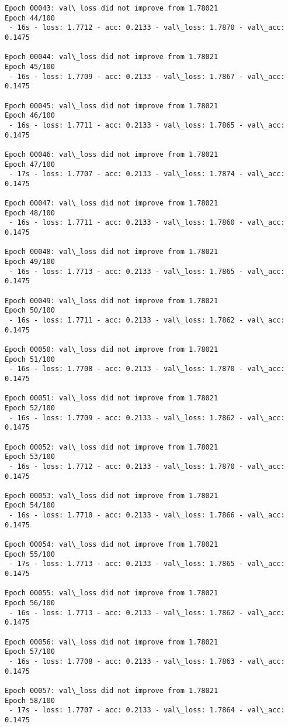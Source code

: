 \documentclass[11pt]{article}
\begin{document}
\begin{Verbatim}[commandchars=\\\{\}]
Epoch 00043: val\_loss did not improve from 1.78021
Epoch 44/100
 - 16s - loss: 1.7712 - acc: 0.2133 - val\_loss: 1.7870 - val\_acc: 0.1475

Epoch 00044: val\_loss did not improve from 1.78021
Epoch 45/100
 - 16s - loss: 1.7709 - acc: 0.2133 - val\_loss: 1.7867 - val\_acc: 0.1475

Epoch 00045: val\_loss did not improve from 1.78021
Epoch 46/100
 - 16s - loss: 1.7711 - acc: 0.2133 - val\_loss: 1.7865 - val\_acc: 0.1475

Epoch 00046: val\_loss did not improve from 1.78021
Epoch 47/100
 - 17s - loss: 1.7707 - acc: 0.2133 - val\_loss: 1.7874 - val\_acc: 0.1475

Epoch 00047: val\_loss did not improve from 1.78021
Epoch 48/100
 - 16s - loss: 1.7711 - acc: 0.2133 - val\_loss: 1.7860 - val\_acc: 0.1475

Epoch 00048: val\_loss did not improve from 1.78021
Epoch 49/100
 - 16s - loss: 1.7713 - acc: 0.2133 - val\_loss: 1.7865 - val\_acc: 0.1475

Epoch 00049: val\_loss did not improve from 1.78021
Epoch 50/100
 - 16s - loss: 1.7711 - acc: 0.2133 - val\_loss: 1.7862 - val\_acc: 0.1475

Epoch 00050: val\_loss did not improve from 1.78021
Epoch 51/100
 - 16s - loss: 1.7708 - acc: 0.2133 - val\_loss: 1.7870 - val\_acc: 0.1475

Epoch 00051: val\_loss did not improve from 1.78021
Epoch 52/100
 - 16s - loss: 1.7709 - acc: 0.2133 - val\_loss: 1.7862 - val\_acc: 0.1475

Epoch 00052: val\_loss did not improve from 1.78021
Epoch 53/100
 - 16s - loss: 1.7712 - acc: 0.2133 - val\_loss: 1.7870 - val\_acc: 0.1475

Epoch 00053: val\_loss did not improve from 1.78021
Epoch 54/100
 - 16s - loss: 1.7710 - acc: 0.2133 - val\_loss: 1.7866 - val\_acc: 0.1475

Epoch 00054: val\_loss did not improve from 1.78021
Epoch 55/100
 - 17s - loss: 1.7713 - acc: 0.2133 - val\_loss: 1.7865 - val\_acc: 0.1475

Epoch 00055: val\_loss did not improve from 1.78021
Epoch 56/100
 - 16s - loss: 1.7713 - acc: 0.2133 - val\_loss: 1.7862 - val\_acc: 0.1475

Epoch 00056: val\_loss did not improve from 1.78021
Epoch 57/100
 - 16s - loss: 1.7708 - acc: 0.2133 - val\_loss: 1.7863 - val\_acc: 0.1475

Epoch 00057: val\_loss did not improve from 1.78021
Epoch 58/100
 - 17s - loss: 1.7707 - acc: 0.2133 - val\_loss: 1.7864 - val\_acc: 0.1475


\end{Verbatim}
\end{document}
